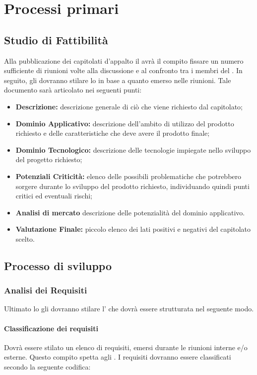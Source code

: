 \section{Processi primari}
\subsection{Studio di Fattibilità}
Alla pubblicazione dei capitolati d'appalto il \textit{\Pm} avrà il compito fissare un
numero sufficiente di riunioni volte alla discussione e al confronto tra i membri del .
In seguito, gli \textit{\AnP} dovranno stilare lo \textit{\SdF} in base a quanto
emerso nelle riunioni. Tale documento sarà articolato nei seguenti punti:
\begin{itemize}
	\item \textbf{Descrizione:} descrizione generale di ciò che viene richiesto
	dal capitolato;
	\item \textbf{Dominio Applicativo:} descrizione dell'ambito di utilizzo del
	prodotto richiesto e delle caratteristiche che deve avere il prodotto finale;
	\item \textbf{Dominio Tecnologico:} descrizione delle tecnologie impiegate
	nello sviluppo del progetto richiesto;
	\item \textbf{Potenziali Criticità:} elenco delle possibili problematiche che potrebbero
	sorgere durante lo sviluppo del prodotto richiesto, individuando quindi punti
	critici ed eventuali rischi;
	\item \textbf{Analisi di mercato} descrizione delle potenzialità del dominio applicativo.
	\item \textbf{Valutazione Finale:} piccolo elenco dei lati positivi e negativi del capitolato scelto.
\end{itemize}

\subsection{Processo di sviluppo}
\subsubsection{Analisi dei Requisiti}
Ultimato lo \textit{\SdF} gli \textit{\AnP} dovranno stilare l'\textit{\AdR} che dovrà 	essere strutturata nel seguente modo.
\paragraph{Classificazione dei requisiti}
Dovrà essere stilato un elenco di requisiti, emersi durante le riunioni interne
e/o esterne. Questo compito spetta agli \textit{\AnP}. I requisiti dovranno
essere classificati secondo la seguente codifica:

